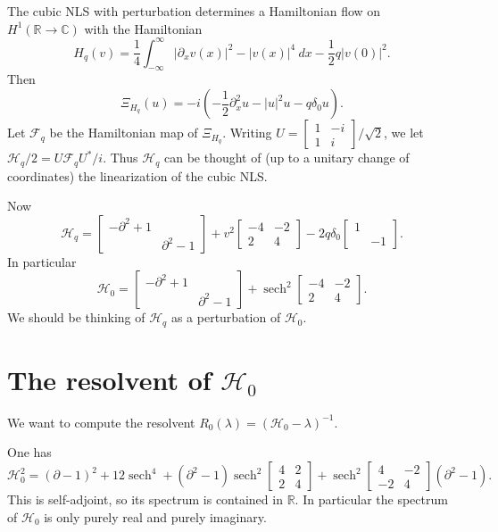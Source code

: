 \documentclass[12pt]{report}
\newcommand{\RR}{\mathbb{R}}
\newcommand{\CC}{\mathbb{C}}
\DeclareMathOperator{\sech}{sech}
\theoremstyle{definition}
\begin{document}
The cubic NLS with perturbation determines a Hamiltonian flow on $H^1(\RR \to \CC)$ with the Hamiltonian
$$H_q(v) = \frac{1}{4}\int_{-\infty}^\infty |\partial_xv(x)|^2 - |v(x)|^4~dx - \frac{1}{2}q|v(0)|^2.$$
Then
$$\Xi_{H_q}(u) = -i \left(-\frac{1}{2}\partial_x^2u - |u|^2u - q\delta_0 u\right).$$
Let $\mathcal F_q$ be the Hamiltonian map of $\Xi_{H_q}$. Writing $U = \begin{bmatrix}1&-i\\1&i\end{bmatrix}/\sqrt 2$, we let $\mathcal H_q/2 = U\mathcal F_qU^*/i$.
Thus $\mathcal H_q$ can be thought of (up to a unitary change of coordinates) the linearization of the cubic NLS.

Now
$$\mathcal H_q = \begin{bmatrix}-\partial^2 + 1 \\&\partial^2 - 1\end{bmatrix} + v^2\begin{bmatrix}-4&-2\\2&4\end{bmatrix}-2q\delta_0\begin{bmatrix}1\\&-1\end{bmatrix}.$$
In particular
$$\mathcal H_0 = \begin{bmatrix}-\partial^2 + 1 \\&\partial^2 - 1\end{bmatrix} + \sech^2 \begin{bmatrix}-4 & -2\\2 & 4\end{bmatrix}.$$
We should be thinking of $\mathcal H_q$ as a perturbation of $\mathcal H_0$.

\section{The resolvent of $\mathcal H_0$}
We want to compute the resolvent $R_0(\lambda) = (\mathcal H_0 - \lambda)^{-1}$.

One has
$$\mathcal H_0^2 = (\partial - 1)^2 + 12 \sech^4 + (\partial^2 - 1)\sech^2 \begin{bmatrix}4 & 2\\2 & 4\end{bmatrix} + \sech^2 \begin{bmatrix}4 & -2\\-2&4\end{bmatrix}(\partial^2 - 1).$$
This is self-adjoint, so its spectrum is contained in $\RR$. In particular the spectrum of $\mathcal H_0$ is only purely real and purely imaginary.
\end{document}
